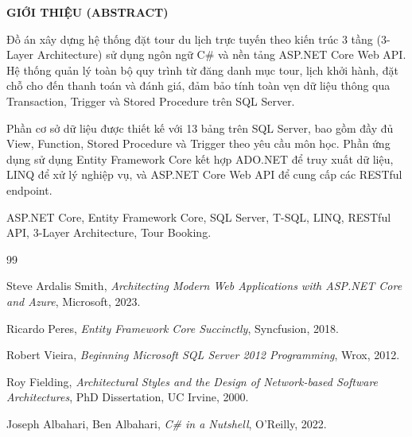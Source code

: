 \documentclass[12pt,a4paper,oneside]{book}
\theoremstyle{plain}
\numberwithin{equation}{chapter}
\begin{document}
\begin{center}
  \large{\textbf{GIỚI THIỆU (ABSTRACT)}}\\
\end{center}

Đồ án xây dựng hệ thống đặt tour du lịch trực tuyến theo kiến trúc 3 tầng
(3-Layer Architecture) sử dụng ngôn ngữ C\# và nền tảng ASP.NET Core Web API.
Hệ thống quản lý toàn bộ quy trình từ đăng danh mục tour, lịch khởi hành,
đặt chỗ cho đến thanh toán và đánh giá, đảm bảo tính toàn vẹn dữ liệu thông
qua Transaction, Trigger và Stored Procedure trên SQL Server.

Phần cơ sở dữ liệu được thiết kế với 13 bảng trên SQL Server, bao gồm đầy đủ
View, Function, Stored Procedure và Trigger theo yêu cầu môn học. Phần ứng dụng
sử dụng Entity Framework Core kết hợp ADO.NET để truy xuất dữ liệu, LINQ để
xử lý nghiệp vụ, và ASP.NET Core Web API để cung cấp các RESTful endpoint.

 ASP.NET Core, Entity Framework Core, SQL Server,
T-SQL, LINQ, RESTful API, 3-Layer Architecture, Tour Booking.

\newpage
\tableofcontents

\newpage
{}
\listoffigures

\newpage
{}
\listoftables

\newpage
{}

\begin{thebibliography}{99}

 Steve Ardalis Smith,
  \textit{Architecting Modern Web Applications with ASP.NET Core and Azure},
  Microsoft, 2023.

 Ricardo Peres,
  \textit{Entity Framework Core Succinctly},
  Syncfusion, 2018.

 Robert Vieira,
  \textit{Beginning Microsoft SQL Server 2012 Programming},
  Wrox, 2012.

 Roy Fielding,
  \textit{Architectural Styles and the Design of Network-based Software Architectures},
  PhD Dissertation, UC Irvine, 2000.

 Joseph Albahari, Ben Albahari,
  \textit{C\# in a Nutshell},
  O'Reilly, 2022.

\end{thebibliography}
\end{document}
